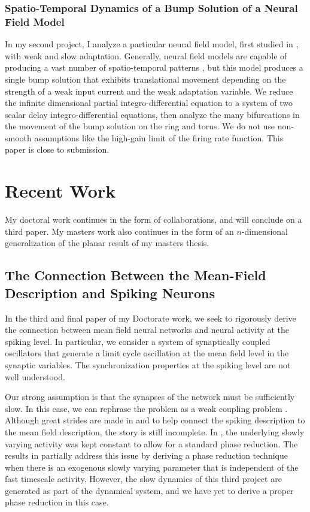 \documentclass[a4paper,11pt]{article}
\begin{document}
\subsubsection{Spatio-Temporal Dynamics of a Bump Solution of a Neural Field Model}
In my second project, I analyze a particular neural field model, first studied in \cite{pinto_ermentrout_2001_siam}, with weak and slow adaptation. Generally, neural field models are capable of producing a vast number of spatio-temporal patterns \cite{breakspear2017dynamic}, but this model produces a single bump solution that exhibits translational movement depending on the strength of a weak input current and the weak adaptation variable. We reduce the infinite dimensional partial integro-differential equation to a system of two scalar delay integro-differential equations, then analyze the many bifurcations in the movement of the bump solution on the ring and torus. We do not use non-smooth assumptions like the high-gain limit of the firing rate function. This paper is close to submission.


\section{Recent Work}
My doctoral work continues in the form of collaborations, and will conclude on a third paper. My masters work also continues in the form of an $n$-dimensional generalization of the planar result of my masters thesis.

\subsection{The Connection Between the Mean-Field Description and Spiking Neurons}
In the third and final paper of my Doctorate work, we seek to rigorously derive the connection between mean field neural networks and neural activity at the spiking level. In particular, we consider a system of synaptically coupled oscillators that generate a limit cycle oscillation at the mean field level in the synaptic variables. The synchronization properties at the spiking level are not well understood.

Our strong assumption is that the synapses of the network must be sufficiently slow. In this case, we can rephrase the problem as a weak coupling problem \cite{rubinrubin}. Although great strides are made in \cite{rubinrubin} and \cite{park2016weakly} to help connect the spiking description to the mean field description, the story is still incomplete. In \cite{rubinrubin}, the underlying slowly varying activity was kept constant to allow for a standard phase reduction. The results in \cite{park2016weakly} partially address this issue by deriving a phase reduction technique when there is an exogenous slowly varying parameter that is independent of the fast timescale activity. However, the slow dynamics of this third project are generated as part of the dynamical system, and we have yet to derive a proper phase reduction in this case.
\end{document}
